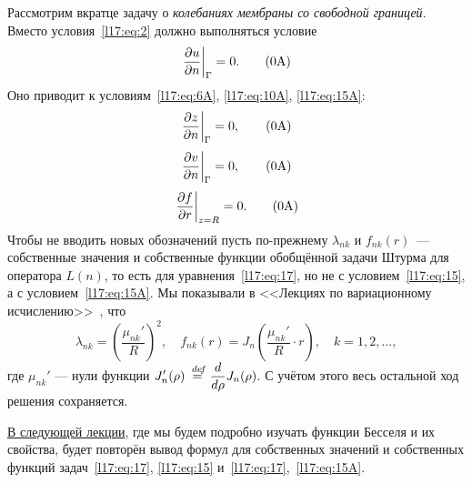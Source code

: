 Рассмотрим вкратце задачу о \emph{колебаниях мембраны со свободной границей}. Вместо условия~\eqref{l17:eq:2} должно выполняться условие\setcounter{equation}{2}
\begin{equation}\label{l17:eq:2A}
	\left.\pder{u}{n}\right|_{\Gamma}=0.\tag{\theequation A}
\end{equation} 
Оно приводит к условиям~\eqref{l17:eq:6A}, \eqref{l17:eq:10A}, \eqref{l17:eq:15A}:\setcounter{equation}{6}%
\begin{equation}\label{l17:eq:6A}
	\left.\pder{z}{n}\right|_{\Gamma}=0,\tag{\theequation A}
\end{equation}\setcounter{equation}{10}%
\begin{equation}\label{l17:eq:10A}
	\left.\pder{v}{n}\right|_{\Gamma}=0,\tag{\theequation A}
\end{equation} \setcounter{equation}{15}%
\begin{equation}\label{l17:eq:15A}
	\left.\pder{f}{r}\right|_{z=R}=0.\tag{\theequation A}
\end{equation} \setcounter{equation}{25}%
Чтобы не вводить новых обозначений пусть по-прежнему $\lambda_{nk}$ и $f_{nk}(r)$~--- собственные значения и собственные функции обобщённой задачи Штурма для оператора $L(n)$, то есть для уравнения~\eqref{l17:eq:17}, но не с условием~\eqref{l17:eq:15}, а с условием~\eqref{l17:eq:15A}. Мы показывали в <<Лекциях по вариационному исчислению>>~\cite{VI}, что 
\begin{equation*}
	\lambda_{nk}=\left(\frac{\mu_{nk}'}{R}\right)^2,\quad f_{nk}(r)=J_n\left(\frac{\mu_{nk}'}{R}\cdot r\right),\quad k=1,2,\ldots,
\end{equation*}
где $\mu_{nk}'$ --- нули функции $\displaystyle J_n'(\rho)\stackrel{\hspace{0.09 cm}de\!f}{=}\frac{d}{d\rho}J_n(\rho)$. С учётом этого весь остальной ход решения сохраняется.
\begin{_rem}
	\hyperref[lecture18]{В следующей лекции}, где мы будем подробно изучать функции Бесселя и их свойства, будет повторён вывод формул для собственных значений и собственных функций задач~\eqref{l17:eq:17}, \eqref{l17:eq:15} и~\eqref{l17:eq:17},~\eqref{l17:eq:15A}.
\end{_rem}